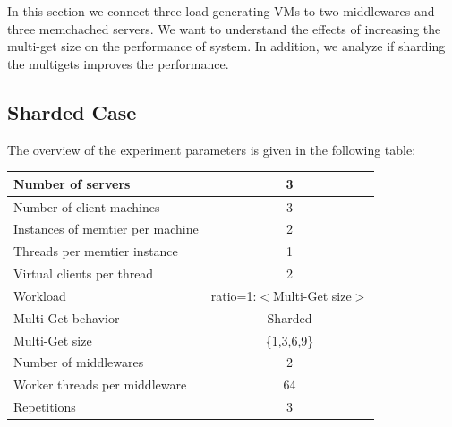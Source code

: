 In this section we connect three load generating VMs to two middlewares and three memchached servers. We want to understand the effects of increasing the multi-get size on the performance of system. In addition, we analyze if sharding the multigets improves the performance.

\subsection{Sharded Case}
The overview of the experiment parameters is given in the following table:
\begin{center}
	\scriptsize{
		\begin{tabular}{|l|c|}
			\hline Number of servers                & 3                       \\ 
			\hline Number of client machines        & 3                       \\ 
			\hline Instances of memtier per machine & 2                       \\ 
			\hline Threads per memtier instance     & 1                       \\
			\hline Virtual clients per thread       & 2     		            \\ 
			\hline Workload                         & ratio=1:$<$Multi-Get size$>$             \\
			\hline Multi-Get behavior               & Sharded                 \\
			\hline Multi-Get size                   & \{1,3,6,9\}                 \\
			\hline Number of middlewares            & 2                       \\
			\hline Worker threads per middleware    & 64 \\
			\hline Repetitions                      & 3                \\ 
			\hline 
		\end{tabular}
	} 
\end{center}

